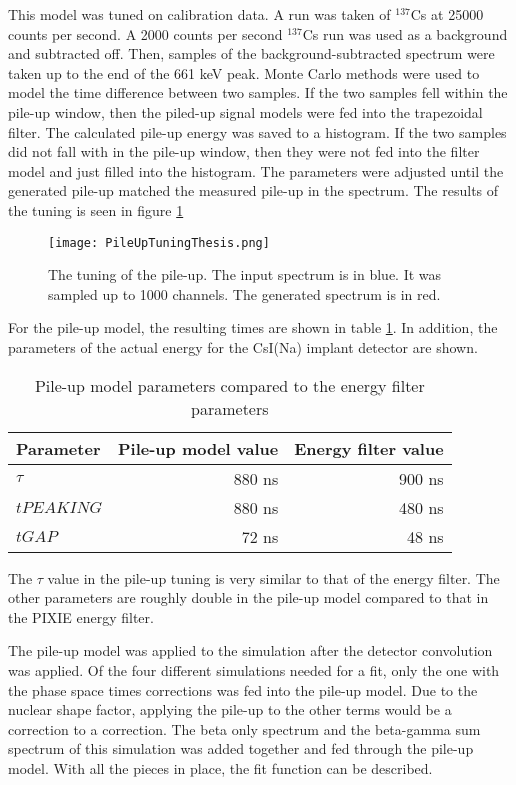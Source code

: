 \documentclass[../MaxHughesThesis.tex]{subfiles}
\begin{document}
This model was tuned on calibration data. 
A run was taken of $^{137}$Cs at 25000 counts per second.
A 2000 counts per second $^{137}$Cs run was used as a background and subtracted off.
Then, samples of the background-subtracted spectrum were taken up to the end of the 661 keV peak.
Monte Carlo methods were used to model the time difference between two samples.
If the two samples fell within the pile-up window, then the piled-up signal models were fed into the trapezoidal filter.
The calculated pile-up energy was saved to a histogram.
If the two samples did not fall with in the pile-up window, then they were not fed into the filter model and just filled into the histogram.
The parameters were adjusted until the generated pile-up matched the measured pile-up in the spectrum.
The results of the tuning is seen in figure \ref{fig:pileuptune}

\begin{figure}[!htb]
	\centerline{\texttt{[image: PileUpTuningThesis.png]}}
	\caption{The tuning of the pile-up.
		 The input spectrum is in blue.
		 It was sampled up to 1000 channels.
		 The generated spectrum is in red.}
	\label{fig:pileuptune}
\end{figure}

For the pile-up model, the resulting times are shown in table \ref{tab:tunepileupmodel}.
In addition, the parameters of the actual energy for the CsI(Na) implant detector are shown.

\begin{table}[!hbt]
	\centering
	\caption{Pile-up model parameters compared to the energy filter parameters}
		\begin{tabular}{lrr}
		Parameter & Pile-up model value & Energy filter value \\ \hline
		$\tau$ & 880 ns & 900 ns \\
		$tPEAKING$ & 880 ns & 480 ns \\
		$tGAP$ & 72 ns & 48 ns  
		\end{tabular}
		\label{tab:tunepileupmodel}
\end{table}

The $\tau$ value in the pile-up tuning is very similar to that of the energy filter.
The other parameters are roughly double in the pile-up model compared to that in the PIXIE energy filter.

The pile-up model was applied to the simulation after the detector convolution was applied. 
Of the four different simulations needed for a fit, only the one with the phase space times corrections was fed into the pile-up model.
Due to the nuclear shape factor, applying the pile-up to the other terms would be a correction to a correction. 
The beta only spectrum and the beta-gamma sum spectrum of this simulation was added together and fed through the pile-up model.
With all the pieces in place, the fit function can be described. 
\end{document}

